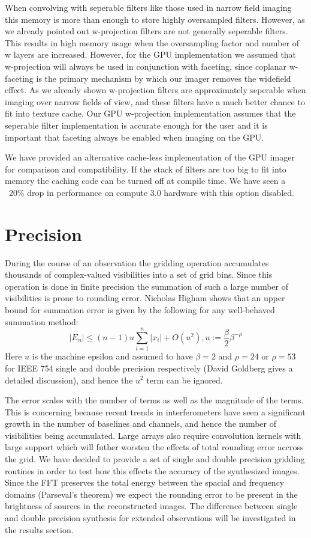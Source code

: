 When convolving with seperable filters like those used in narrow field imaging this memory is more than enough to store highly oversampled filters. However, 
as we already pointed out w-projection filters are not generally seperable filters. This results in high memory usage when the oversampling factor and number of w layers are 
increased. However, for the GPU implementation we assumed that w-projection will always be used in conjunction with faceting, since coplanar w-faceting
is the primary mechanism by which our imager removes the widefield effect. As we already shown w-projection filters are approximately seperable when 
imaging over narrow fields of view, and these filters have a much better chance to fit into texture cache. Our GPU w-projection implementation
assumes that the seperable filter implementation is accurate enough for the user and it is important that faceting always be enabled when imaging on 
the GPU.

We have provided an alternative cache-less implementation of the GPU imager for comparison and compatibility.
If the stack of filters are too big to fit into memory the caching code can be turned off at compile time. We have seen
a ~20\% drop in performance on compute 3.0 hardware with this option disabled.

\section{Precision}
During the course of an observation the gridding operation accumulates thousands of complex-valued visibilities into a set of grid bins. Since this operation
is done in finite precision the summation of such a large number of visibilities is prone to rounding error. Nicholas Higham \cite{higham1993accuracy} shows that
an upper bound for summation error is given by the following for any well-behaved summation method:
\begin{equation}
 |E_n| \leq (n-1)u\sum_{i=1}^{n}{|x_i|} + O(u^2), u := \frac{\beta}{2}\beta^{-\rho}
\end{equation}
Here $u$ is the machine epsilon and assumed to have $\beta=2$ and $\rho=24$ or $\rho=53$ for IEEE 754 single and double precision respectively (David Goldberg \cite{goldberg1991every}
gives a detailed discussion), and hence the $u^2$ term can be ignored.

The error scales with the number of terms as well as the magnitude of the terms. This is concerning because recent trends in interferometers have
seen a significant growth in the number of baselines and channels, and hence the number of visibilities being accumulated. Large arrays also require
convolution kernels with large support which will futher worsten the effects of total rounding error accross the grid. We have decided to provide 
a set of single and double precision gridding routines in order to test how this effects the accuracy of the synthesized images. Since the FFT preserves
the total energy between the spacial and frequency domains (Parseval's theorem) we expect the rounding error to be present in the brightness of sources in 
the reconstructed images. The difference between single and double precision synthesis for extended observations will be investigated in the results section.

